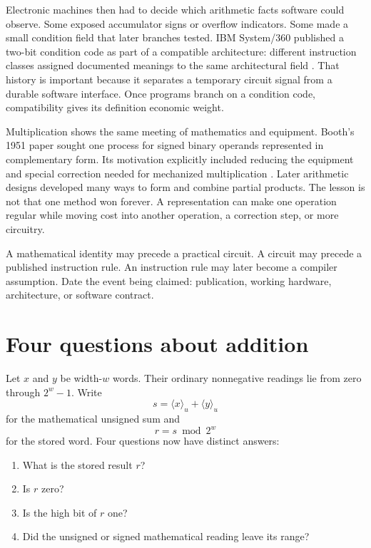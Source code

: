 Electronic machines then had to decide which arithmetic facts software could
observe. Some exposed accumulator signs or overflow indicators. Some made a
small condition field that later branches tested. IBM System/360 published a
two-bit condition code as part of a compatible architecture: different
instruction classes assigned documented meanings to the same architectural
field \autocite{amdahl1964system360,ibm1964system360principles}. That history
is important because it separates a temporary circuit signal from a durable
software interface. Once programs branch on a condition code, compatibility
gives its definition economic weight.

Multiplication shows the same meeting of mathematics and equipment. Booth's
1951 paper sought one process for signed binary operands represented in
complementary form. Its motivation explicitly included reducing the equipment
and special correction needed for mechanized multiplication
\autocite{booth1951multiplication}. Later arithmetic designs developed many
ways to form and combine partial products. The lesson is not that one method
won forever. A representation can make one operation regular while moving
cost into another operation, a correction step, or more circuitry.

\begin{sidebar}[title={Three dates can describe one arithmetic idea}]
A mathematical identity may precede a practical circuit. A circuit may
precede a published instruction rule. An instruction rule may later become a
compiler assumption. Date the event being claimed: publication, working
hardware, architecture, or software contract.
\end{sidebar}

\section{Four questions about addition}

Let \(x\) and \(y\) be width-\(w\) words. Their ordinary nonnegative readings
lie from zero through \(2^w-1\). Write
\[
  s=\langle x\rangle_u+\langle y\rangle_u
\]
for the mathematical unsigned sum and
\[
  r=s\bmod 2^w
\]
for the stored word. Four questions now have distinct answers:

\begin{enumerate}
\item What is the stored result \(r\)?
\item Is \(r\) zero?
\item Is the high bit of \(r\) one?
\item Did the unsigned or signed mathematical reading leave its range?
\end{enumerate}

